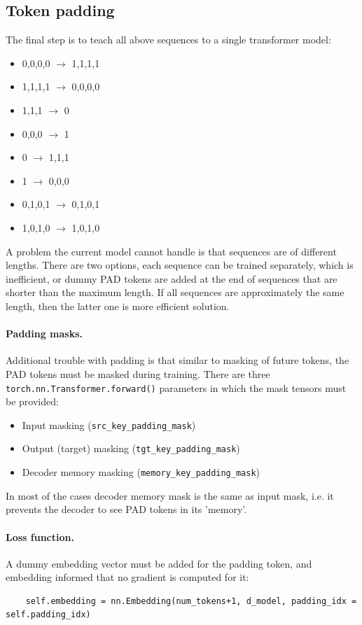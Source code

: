 \documentclass[final]{article}
\begin{document}
\subsection{Token padding}
The final step is to teach all above sequences to a single transformer model:
\begin{itemize}
  \item 0,0,0,0 $\rightarrow$ 1,1,1,1
  \item 1,1,1,1 $\rightarrow$ 0,0,0,0
  \item   1,1,1 $\rightarrow$ 0
  \item   0,0,0 $\rightarrow$ 1
  \item       0 $\rightarrow$ 1,1,1
  \item       1 $\rightarrow$ 0,0,0
  \item 0,1,0,1 $\rightarrow$ 0,1,0,1
  \item 1,0,1,0 $\rightarrow$ 1,0,1,0
\end{itemize}
A problem the current model cannot handle is that sequences are of different lengths. There are two options, each sequence can be trained separately, which is inefficient, or dummy PAD tokens are added at the end of sequences that are shorter than the maximum length. If all sequences are approximately the same length, then the latter one is more efficient solution.

\paragraph{Padding masks.} Additional trouble with padding is that similar to masking of future tokens, the PAD tokens must be masked during training. There are three \texttt{torch.nn.Transformer.forward()} parameters in which the mask tensors must be provided:
\begin{itemize}
  \item Input masking (\texttt{src\_key\_padding\_mask})
  \item Output (target) masking (\texttt{tgt\_key\_padding\_mask})
  \item Decoder memory masking (\texttt{memory\_key\_padding\_mask})
\end{itemize}
In most of the cases decoder memory mask is the same as input mask, i.e. it prevents the decoder to see PAD tokens in its 'memory'.

\paragraph{Loss function.} A dummy embedding vector must be added for the padding token, and embedding informed that no gradient is computed for it:
\begin{lstlisting}
    self.embedding = nn.Embedding(num_tokens+1, d_model, padding_idx = self.padding_idx)
\end{lstlisting}
\end{document}
